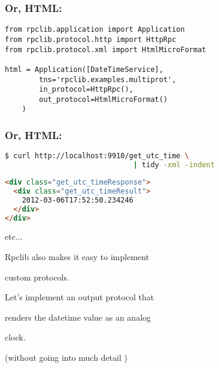 \documentclass{beamer}
\begin{document}
\begin{frame}[fragile]
  \frametitle{Or, HTML:}

  \begin{lstlisting}
from rpclib.application import Application
from rpclib.protocol.http import HttpRpc
from rpclib.protocol.xml import HtmlMicroFormat

html = Application([DateTimeService],
        tns='rpclib.examples.multiprot',
        in_protocol=HttpRpc(),
        out_protocol=HtmlMicroFormat()
    )
  \end{lstlisting}
\end{frame}


\begin{frame}[fragile]
  \frametitle{Or, HTML:}

  \begin{lstlisting}[language=sh,frame=topline]
$ curl http://localhost:9910/get_utc_time \
                              | tidy -xml -indent
  \end{lstlisting}
  \begin{lstlisting}[language=html, frame=bottomline]
<div class="get_utc_timeResponse">
  <div class="get_utc_timeResult">
    2012-03-06T17:52:50.234246
  </div>
</div>
  \end{lstlisting}
\end{frame}


\begin{frame}
  \LARGE
  \begin{center}
    etc...
  \end{center}
\end{frame}

\begin{frame}
  \LARGE
  \begin{center}
    Rpclib also makes it easy to implement

    \bigskip

    custom protocols.
  \end{center}
\end{frame}

\begin{frame}
  \LARGE
  \begin{center}
    Let's implement an output protocol that

    \bigskip

    renders the datetime value as an analog

    \bigskip

    clock.

    \bigskip
    \large
    (without going into much detail \smiley)

  \end{center}
\end{frame}
\end{document}
